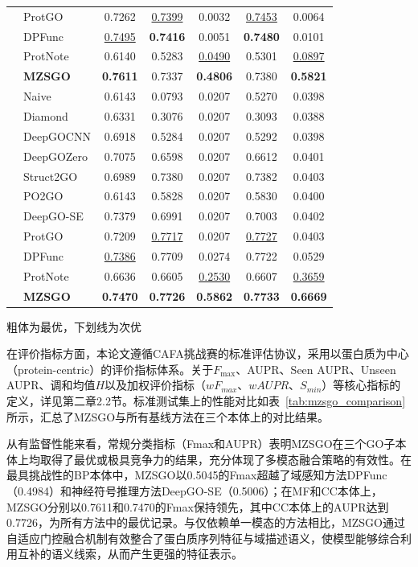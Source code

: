 \begin{table}[htbp]
{\begin{tabular}{llccccc}
 & ProtGO & 0.7262 & \underline{0.7399} & 0.0032 & \underline{0.7453} & 0.0064 \\
 & DPFunc & \underline{0.7495} & \textbf{0.7416} & 0.0051 & \textbf{0.7480} & 0.0101 \\
 & ProtNote & 0.6140 & 0.5283 & \underline{0.0490} & 0.5301 & \underline{0.0897} \\
 & \textbf{MZSGO} & \textbf{0.7611} & 0.7337 & \textbf{0.4806} & 0.7380 & \textbf{0.5821} \\
\addlinespace[5pt]
\multirow{11}{*}{\textbf{CC}} 
 & Naive & 0.6143 & 0.0793 & 0.0207 & 0.5270 & 0.0398 \\
 & Diamond & 0.6331 & 0.3076 & 0.0207 & 0.3093 & 0.0388 \\
 & DeepGOCNN & 0.6918 & 0.5284 & 0.0207 & 0.5292 & 0.0398 \\
 & DeepGOZero & 0.7075 & 0.6598 & 0.0207 & 0.6612 & 0.0401 \\
 & Struct2GO & 0.6989 & 0.7380 & 0.0207 & 0.7382 & 0.0403 \\
 & PO2GO & 0.6143 & 0.5828 & 0.0207 & 0.5830 & 0.0400 \\
 & DeepGO-SE & 0.7379 & 0.6991 & 0.0207 & 0.7003 & 0.0402 \\
 & ProtGO & 0.7209 & \underline{0.7717} & 0.0207 & \underline{0.7727} & 0.0403 \\
 & DPFunc & \underline{0.7386} & 0.7709 & 0.0274 & 0.7722 & 0.0529 \\
 & ProtNote & 0.6636 & 0.6605 & \underline{0.2530} & 0.6607 & \underline{0.3659} \\
 & \textbf{MZSGO} & \textbf{0.7470} & \textbf{0.7726} & \textbf{0.5862} & \textbf{0.7733} & \textbf{0.6669} \\
\bottomrule
\end{tabular}%
}
\vspace{0.3em}

{\raggedright\footnotesize 粗体为最优，下划线为次优\par}
\end{table}

在评价指标方面，本论文遵循CAFA挑战赛\cite{zhou2019cafa}的标准评估协议，采用以蛋白质为中心（protein-centric）的评价指标体系。关于$F_{\max}$、AUPR、Seen AUPR、Unseen AUPR、调和均值$H$以及加权评价指标（$wF_{max}$、$wAUPR$、$S_{min}$）等核心指标的定义，详见第二章2.2节。标准测试集上的性能对比如表~\ref{tab:mzsgo_comparison}所示，汇总了MZSGO与所有基线方法在三个本体上的对比结果。

从有监督性能来看，常规分类指标（Fmax和AUPR）表明MZSGO在三个GO子本体上均取得了最优或极具竞争力的结果，充分体现了多模态融合策略的有效性。在最具挑战性的BP本体中，MZSGO以0.5045的Fmax超越了域感知方法DPFunc（0.4984）和神经符号推理方法DeepGO-SE（0.5006）；在MF和CC本体上，MZSGO分别以0.7611和0.7470的Fmax保持领先，其中CC本体上的AUPR达到0.7726，为所有方法中的最优记录。与仅依赖单一模态的方法相比，MZSGO通过自适应门控融合机制有效整合了蛋白质序列特征与域描述语义，使模型能够综合利用互补的语义线索，从而产生更强的特征表示。

